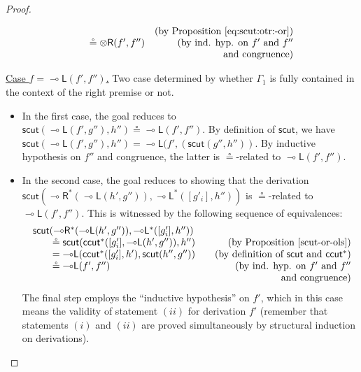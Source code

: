 \documentclass[sn-mathphys-num]{sn-jnl}%
\newcommand{\GG}{\Gamma}
\newcommand{\tr}{\otimes\mathsf{R}}
\newcommand{\lolli}{\multimap}
\newcommand{\lleft}{{\lolli}\mathsf{L}}
\newcommand{\lright}{{\lolli}\mathsf{R}}
\newcommand{\mf}[1]{\mathsf{#1}}
\newcommand{\scut}[2]{\mf{scut} (#1 , #2)}
\theoremstyle{thmstyleone}%
\theoremstyle{thmstyletwo}%
\theoremstyle{thmstylethree}%
\begin{document}
\begin{proof}
\begin{itemize}
\[\begin{array}{lr}
        & \text{(by Proposition \ref{eq:scut:otr:-or})} \\
        \qquad \circeq \tr (f',f'')
        & \text{(by ind. hyp. on $f'$ and $f''$}\\
        & \text{and congruence)}
      \end{array}
      \]
  \end{itemize}
  \underline{Case $f = \lleft (f',f'')$.} Two case determined by whether $\GG_1$ is fully contained in the context of the right premise or not.
  \begin{itemize}
    \item In the first case, the goal reduces to $\scut{\lleft(f',g'')}{h''} \circeq \lleft (f' , f'')$. By definition of $\mf{scut}$, we have $\scut{\lleft(f',g'')}{h''} = \lleft(f', (\scut{g''}{h''})$. By inductive hypothesis on $f''$ and congruence, the latter is $\circeq$-related to $\lleft (f' , f'')$.
    \item In the second case, the goal reduces to showing that the derivation $\mf{scut}(\lright^* (\lleft(h',g'')),\lleft^*([g'_i],h''))$ is $\circeq$-related to $\lleft (f',f'')$. This is witnessed by the following sequence of equivalences:
  \[\arraycolsep=10pt    
      \begin{array}{lr}
        \mf{scut}(\lright^* (\lleft(h',g'')),\lleft^*([g'_i],h'')) \\
        \qquad \circeq \mf{scut}(\mf{ccut^*}([g'_i],\lleft(h',g'')),h'')
        & \text{(by Proposition \ref{scut-or-ols})} \\
        \qquad = \lleft(\mf{ccut^*}([g'_i],h'),\mf{scut}(h'',g''))
        & \text{(by definition of $\mf{scut}$ and $\mf{ccut^*}$)} \\
        \qquad \circeq \lleft (f',f'')
        & \text{(by ind. hyp. on $f'$ and $f''$}\\
        & \text{and congruence)}
      \end{array}
      \]
      The final step employs the ``inductive hypothesis'' on $f'$, which in this case means the validity of statement $(ii)$ for derivation $f'$ (remember that statements $(i)$ and $(ii)$ are proved simultaneously by structural induction on derivations).
  \end{itemize}
\end{proof}
\end{document}
